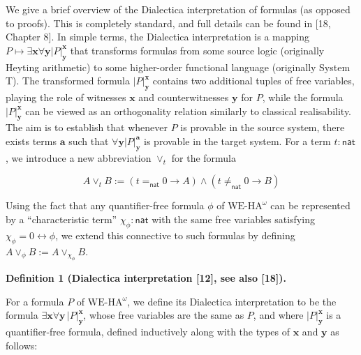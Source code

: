 \documentclass[10pt,a4paper]{article}
\begin{document}
 
We give a brief overview of the Dialectica interpretation of formulas (as opposed to proofs). This is completely standard, and full details can be found in [18, Chapter 8]. In simple terms, the Dialectica interpretation is a mapping $P\mapsto\exists\bm{x}\forall\bm{y}|{P}|^{\bm{x}}_{\bm{y}}$ that transforms formulas from some source logic (originally Heyting arithmetic) to some higher-order functional language (originally System T). The transformed formula $|{P}|^{\bm{x}}_{\bm{y}}$ contains two additional tuples of free variables, playing the role of witnesses $\bm{x}$ and counterwitnesses $\bm{y}$ for $P$, while the formula $|{P}|^{\bm{x}}_{\bm{y}}$ can be viewed as an orthogonality relation similarly to classical realisability. The aim is to establish that whenever $P$ is provable in the source system, there exists terms $\bm{a}$ such that $\forall\bm{y}|{P}|^{\bm{a}}_{\bm{y}}$ is provable in the target system. For a term $t:\mathsf{nat}$, we introduce a new abbreviation $\vee_{t}$ for the formula\par
  
\par  \quad  \[A\vee_{t}B:=(t=_{\mathsf{nat}}0\to A)\wedge(t\neq_{\mathsf{nat}}0\to B)\]\quad  \quad  
  
Using the fact that any quantifier-free formula $\phi$ of $\mathrm{WE}\mbox{-}\mathrm{HA}^{\omega}$ can be represented by a “characteristic term” $\chi_{\phi}:\mathsf{nat}$ with the same free variables satisfying $\chi_{\phi}=0\leftrightarrow\phi$, we extend this connective to such formulas by defining $A\vee_{\phi}B:=A\vee_{\chi_{\phi}}B$.\par
 
 
 
\par\medskip\noindent\textbf{Definition 1 (Dialectica interpretation [12], see also [18]).}\par
 
 
For a formula $P$ of $\mathrm{WE}\mbox{-}\mathrm{HA}^{\omega}$, we define its Dialectica interpretation to be the formula $\exists\bm{x}\forall\bm{y}\,|{P}|^{\bm{x}}_{\bm{y}}$, whose free variables are the same as $P$, and where $|{P}|^{\bm{x}}_{\bm{y}}$ is a quantifier-free formula, defined inductively along with the types of $\bm{x}$ and $\bm{y}$ as follows:\par
 
\end{document}
